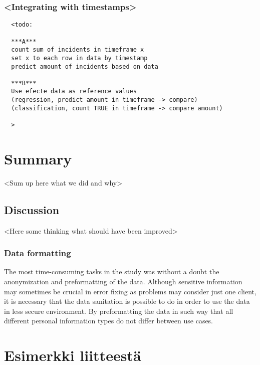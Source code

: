 \documentclass[english, 12pt, a4paper, elec, utf8, a-1b, online]{aaltothesis}
\begin{document}
\subsubsection*{<Integrating with timestamps>}


\begin{verbatim}
  <todo:

  ***A***
  count sum of incidents in timeframe x
  set x to each row in data by timestamp
  predict amount of incidents based on data

  ***B***
  Use efecte data as reference values
  (regression, predict amount in timeframe -> compare)
  (classification, count TRUE in timeframe -> compare amount)

  >
\end{verbatim}

\clearpage




\section{Summary}\label{sec:summary}

<Sum up here what we did and why>

\subsection{Discussion}\label{subsec:discussion}
<Here some thinking what should have been improved>

\subsubsection*{Data formatting}
The most time-consuming tasks in the study
was without a doubt
the anonymization and preformatting of the data.
Although sensitive information may sometimes be crucial in error fixing
as problems may consider just one client,
it is necessary that the data sanitation is possible to do
in order to use the data in less secure environment.
By preformatting the data in such way
that all different personal information types
do not differ between use cases.


\clearpage









\clearpage

\thesisappendix

\section{Esimerkki liitteestä}\label{sec:LiiteA}


\clearpage
\end{document}
